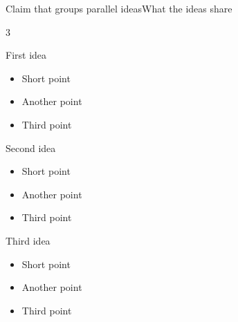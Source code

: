 \begin{frame}[c]{Claim that groups parallel ideas}{What the ideas share}
  \begin{cardrow}{3}
    \begin{cardtitled}{First idea}
      \begin{itemize}
        \item Short point
        \item Another point
        \item Third point
      \end{itemize}
    \end{cardtitled}
    \begin{cardtitled}{Second idea}
      \begin{itemize}
        \item Short point
        \item Another point
        \item Third point
      \end{itemize}
    \end{cardtitled}
    \begin{cardtitled}{Third idea}
      \begin{itemize}
        \item Short point
        \item Another point
        \item Third point
      \end{itemize}
    \end{cardtitled}
  \end{cardrow}
\end{frame}
